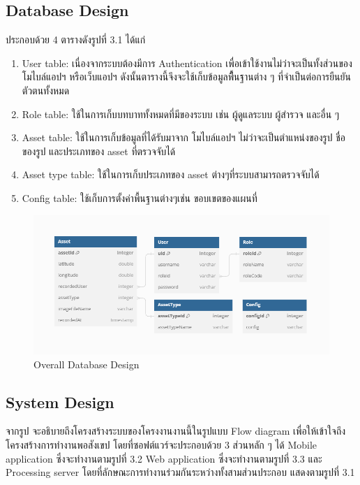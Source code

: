 \subsection{Database Design}
ประกอบด้วย 4 ตารางดังรูปที่ 3.1 ได้แก่
\begin{enumerate}
  \item User table: เนื่องจากระบบต้องมีการ Authentication เพื่อเข้าใช้งานไม่ว่าจะเป็นทั้งส่วนของ โมไบล์แอปฯ หรือเว็บแอปฯ 
  ดังนั้นตารางนี้จึงจะใช้เก็บข้อมูลพืื้นฐานต่าง ๆ ที่จำเป็นต่อการยืนยันตัวตนทั้งหมด 
  \item Role table: ใช้ในการเก็บบทบาททั้งหมดที่มีของระบบ เช่น ผู้ดูแลระบบ ผู้สำรวจ และอื่น ๆ 
  \item Asset table: ใช้ในการเก็บข้อมูลที่ได้รับมาจาก โมไบล์แอปฯ ไม่ว่าจะเป็นตำแหน่งของรูป ชื่อของรูป และประเภทของ asset ที่ตรวจจับได้ 
  \item Asset type table: ใช้ในการเก็บประเภทของ asset ต่างๆที่ระบบสามารถตรวจจับได้ 
  \item Config table: ใช้เก็บการตั้งค่าพื้นฐานต่างๆเช่น ขอบเขตของแผนที่ 
\end{enumerate}

\begin{figure}[ht]
  \begin{center}
  \includegraphics[scale=0.8]{resources/ScreetnerDB.png}
  \end{center}
  \caption[Database Design]{Overall Database Design}
  \label{fig:database}
\end{figure}

\newpage
\subsection{System Design}
จากรูป จะอธิบายถึงโครงสร้างระบบของโครงงานงานนี้ในรูปแบบ Flow diagram เพื่อให้เข้าใจถึงโครงสร้างการทำงานพอสังเขป 
โดยที่ซอฟต์แวร์จะประกอบด้วย 3 ส่วนหลัก ๆ ได้ Mobile application ซึ่งจะทำงานตามรูปที่ 3.2 Web application ซึ่งจะทำงานตามรูปที่ 3.3 
และ Processing server โดยที่ลักษณะการทำงานร่วมกันระหว่างทั้งสามส่วนประกอบ แสดงตามรูปที่ 3.1 

